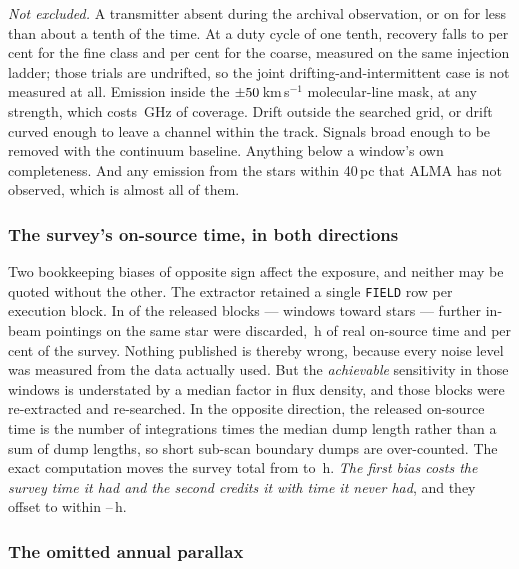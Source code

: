 \noindent\emph{Not excluded.} A transmitter absent during the archival
observation, or on for less than about a tenth of the time. At a duty cycle
of one tenth, recovery falls to \DwellFineT{} per cent for the fine class
and \DwellCoarseT{} per cent for the coarse, measured on the same injection
ladder; those trials are undrifted, so the joint
drifting-and-intermittent case is not measured at all. Emission inside
the $\pm50$\,km\,s$^{-1}$ molecular-line mask, at any strength,
which costs \MaskLostGHz\,GHz of coverage. Drift outside the searched grid,
or drift curved enough to leave a channel within the track. Signals broad
enough to be removed with the continuum baseline. Anything below a window's
own completeness. And any emission from the \NGaiaCensus{} stars within
40\,pc that ALMA has not observed, which is almost all of them.

\subsubsection{The survey's on-source time, in both directions}
\label{sec:exposure}

Two bookkeeping biases of opposite sign affect the exposure, and neither may
be quoted without the other. The extractor retained a single \texttt{FIELD} row per execution block.
In \TruncNBlocks{} of the \ExpNBlocks{} released blocks --- \TruncNWin{}
windows toward \TruncNStars{} stars --- further in-beam pointings on the
same star were discarded, \TruncHoursLost\,h of real on-source time and
\TruncPctSurvey{} per cent of the survey. Nothing published is thereby
wrong, because every noise level was measured from the data actually used.
But the \emph{achievable} sensitivity in those windows is understated by a
median factor \TruncGainMed{} in flux density, and those blocks were
re-extracted and re-searched. In the opposite direction, the released
on-source time is the number of integrations times the median dump length
rather than a sum of dump lengths, so short sub-scan boundary dumps are
over-counted. The exact computation moves the survey total from \OcOldMax{}
to \OcNewMax\,h. \emph{The first bias costs the survey time it
had and the second credits it with time it never had}, and they offset to
within \ExpNetLo--\ExpNetHi\,h.

\subsubsection{The omitted annual parallax} \label{sec:parallax}

